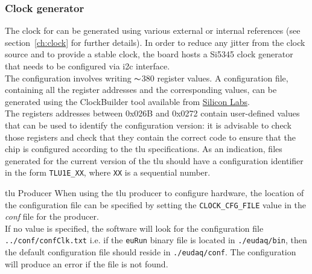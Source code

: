 \subsubsection{Clock generator}
The clock for \brd can be generated using various external or internal references (see section~\ref{ch:clock} for further details). In order to reduce any jitter from the clock source and to provide a stable clock, the board hosts a Si5345 clock generator that needs to be configured via \gls{i2c} interface.\\
The configuration involves writing $\thicksim$380 register values. A configuration file, containing all the register addresses and the corresponding values, can be generated using the ClockBuilder tool available from \href{http://www.enclustra.com/en/home/}{Silicon Labs}.\\
The registers addresses between 0x026B and 0x0272 contain user-defined values that can be used to identify the configuration version: it is advisable to check those registers and check that they contain the correct code to ensure that the chip is configured according to the \gls{tlu} specifications. As an indication, files generated for the current version of the \gls{tlu} should have a configuration identifier in the form \verb|TLU1E_XX|, where \verb|XX| is a sequential number.\\
\begin{alertinfo}{\gls{tlu} Producer}
    When using the \gls{tlu} producer to configure hardware, the location of the configuration file can be specified by setting the \texttt{CLOCK\_CFG\_FILE} value in the \emph{conf} file for the producer.\\
    If no value is specified, the software will look for the configuration file \texttt{../conf/confClk.txt} i.e. if the \texttt{euRun} binary file is located in \texttt{./eudaq/bin}, then the default configuration file should reside in \texttt{./eudaq/conf}. The configuration will produce an error if the file is not found.
\end{alertinfo}

